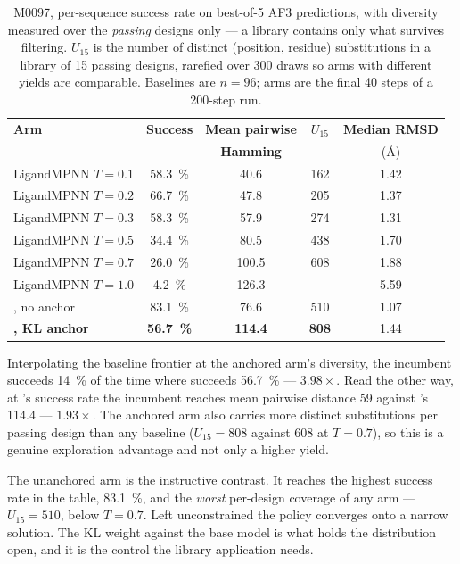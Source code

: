 \begin{table}[htbp]
\centering
\caption{M0097, per-sequence success rate on best-of-5 AF3 predictions, with
diversity measured over the \emph{passing} designs only --- a library contains
only what survives filtering. $U_{15}$ is the number of distinct
(position, residue) substitutions in a library of 15 passing designs, rarefied
over 300 draws so arms with different yields are comparable. Baselines are
$n = 96$; \cleo{} arms are the final 40 steps of a 200-step run.}
\label{tab:ame-frontier}
\begin{tabular}{@{}lcccc@{}}
\toprule
\textbf{Arm} & \textbf{Success} & \textbf{Mean pairwise} & $U_{15}$ &
\textbf{Median RMSD} \\
             &                  & \textbf{Hamming}       &          &
(\si{\angstrom}) \\
\midrule
LigandMPNN $T{=}0.1$ & \SI{58.3}{\percent} & 40.6  & 162 & 1.42 \\
LigandMPNN $T{=}0.2$ & \SI{66.7}{\percent} & 47.8  & 205 & 1.37 \\
LigandMPNN $T{=}0.3$ & \SI{58.3}{\percent} & 57.9  & 274 & 1.31 \\
LigandMPNN $T{=}0.5$ & \SI{34.4}{\percent} & 80.5  & 438 & 1.70 \\
LigandMPNN $T{=}0.7$ & \SI{26.0}{\percent} & 100.5 & 608 & 1.88 \\
LigandMPNN $T{=}1.0$ & \SI{4.2}{\percent}  & 126.3 & --- & 5.59 \\
\midrule
\cleo{}, no anchor         & \SI{83.1}{\percent} & 76.6 & 510 & 1.07 \\
\textbf{\cleo{}, KL anchor} & \textbf{\SI{56.7}{\percent}} & \textbf{114.4} &
  \textbf{808} & 1.44 \\
\bottomrule
\end{tabular}
\end{table}

Interpolating the baseline frontier at the anchored arm's diversity, the
incumbent succeeds \SI{14}{\percent} of the time where \cleo{} succeeds
\SI{56.7}{\percent} --- $\mathbf{3.98\times}$. Read the other way, at \cleo{}'s
success rate the incumbent reaches mean pairwise distance \num{59} against
\cleo{}'s \num{114.4} --- $\mathbf{1.93\times}$. The anchored arm also carries
more distinct substitutions per passing design than any baseline
($U_{15} = 808$ against \num{608} at $T{=}0.7$), so this is a genuine
exploration advantage and not only a higher yield.

The unanchored arm is the instructive contrast. It reaches the highest success
rate in the table, \SI{83.1}{\percent}, and the \emph{worst} per-design coverage
of any \cleo{} arm --- $U_{15} = 510$, below $T{=}0.7$. Left unconstrained the
policy converges onto a narrow solution. The KL weight against the base model is
what holds the distribution open, and it is the control the library application
needs.

